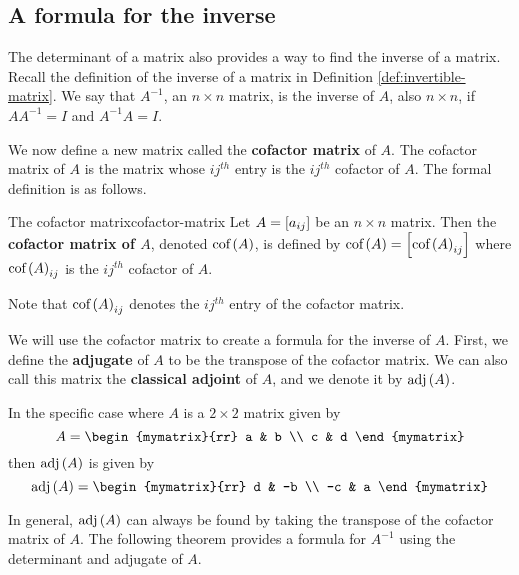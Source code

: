 \subsection{A formula for the inverse}

The determinant of a matrix also provides a way to find the inverse of a matrix.
Recall the definition of the inverse of a matrix in Definition \ref{def:invertible-matrix}.
We say that $A^{-1}$, an $n \times n$ matrix, is the inverse of $A$, also $n \times n$, if $AA^{-1} = I$ and $A^{-1}A=I$. 

We now define a new matrix called the \textbf{cofactor matrix} of $A$.  
The cofactor matrix of $A$ is the matrix whose $ij^{th}$ entry is the $ij^{th}$ cofactor of $A$.
The formal definition is as follows.

\begin{definition}{The cofactor matrix}{cofactor-matrix}
Let $A=\left[a_{ij}\right]$ be an $n\times n$ matrix. Then the
\textbf{cofactor matrix of $A$}, denoted 
$\mbox{\rm cof}\left(A\right)$, is defined by $\mbox{\rm cof}\left(A\right) =\left[
\mbox{\rm cof}\left(A\right)_{ij}\right] $ where  $\mbox{\rm cof}\left(A\right)_{ij}$ is the $ij^{th}$ cofactor of $A$.
\end{definition}

Note that $\mbox{\rm cof}\left(A\right)_{ij}$ denotes the $ij^{th}$ entry of the cofactor matrix.

We will use the cofactor matrix to create a formula for the inverse of $A$. First,
we define the \textbf{adjugate} of $A$ to be the transpose of 
the cofactor matrix. We can also call this matrix the \textbf{classical adjoint} of $A$,
and we denote it by $\mbox{\rm adj} \left(A\right)$. 

In the specific case where $A$ is a $2 \times 2$ matrix given by
\begin{equation*}
A = \begin{mymatrix}{rr}
a & b \\
c & d
\end{mymatrix}
\end{equation*}
then $\mbox{\rm adj}\left(A\right)$ is given by
\begin{equation*}
\func{adj}\tup{A} = 
\begin{mymatrix}{rr}
d & -b \\
-c & a
\end{mymatrix}
\end{equation*}

In general, $\mbox{\rm adj}\left(A\right)$ can always be found by taking the transpose of the cofactor matrix of $A$. The following theorem provides a formula for $A^{-1}$ using the determinant and adjugate of $A$.

